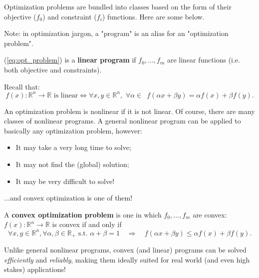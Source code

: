 Optimization problems are bundled into classes based on the form of their objective ($f_0$) and constraint ($f_i$) functions. Here are some below.

\begin{Fact}
  Note: in optimization jargon, a "program" is an alias for an "optimization problem".
\end{Fact}


\begin{Definition}
  (\ref{eq:opt_problem}) is a \textbf{linear program} if $f_0,...,f_m$ are linear functions (i.e. both objective and constraints).
\end{Definition}

\begin{Definition}
  Recall that:
  $$
  f(x):\mathbb R^n\to\mathbb R\text{ is linear}\Leftrightarrow \forall x,y\in\mathbb R^n,\,\,\forall\alpha\in\mathbb \,\,\, f(\alpha x+\beta y)=\alpha f(x)+\beta f(y).
  $$
\end{Definition}


An optimization problem is nonlinear if it is not linear. Of course, there are many classes of nonlinear programs. A general nonlinear program can be applied to basically any optimization problem, however:

\begin{itemize}
\item It may take a very long time to solve;
\item It may not find the (global) solution;
\item It may be very difficult to solve!
\end{itemize}


...and convex optimization is one of them!

\begin{Definition}
  A \textbf{convex optimization problem} is one in which $f_0,\ldots,f_m$ are convex:
  $f(x):\mathbb R^n\to\mathbb R$ is convex if and only if $$
  \forall x,y\in\mathbb R^n, \forall \alpha,\beta\in\mathbb R_{+}\text{ s.t. }\alpha+\beta=1\quad\Rightarrow\quad f(\alpha x+\beta y)\le \alpha f(x)+\beta f(y).
  $$
\end{Definition}

Unlike general nonlinear programs, convex (and linear) programs can be solved \textit{efficiently} and \textit{reliably}, making them ideally suited for real world (and even high stakes) applications!


